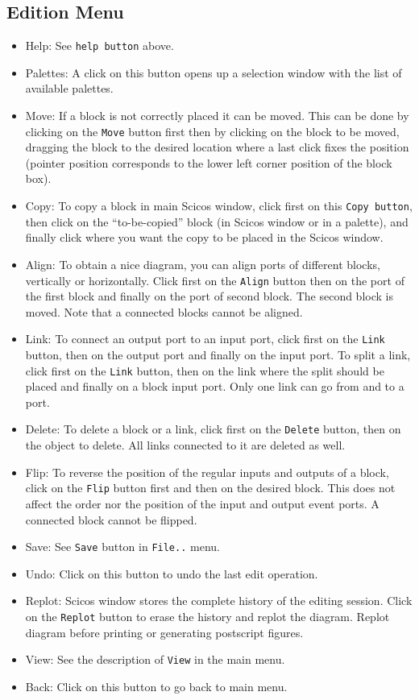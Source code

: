 \subsection{Edition Menu}
\begin{itemize}
\item {Help:} See {\tt help button} above.
\item {Palettes:} A click on this button opens up a selection window
  with the list of available palettes.
\item {Move:} If a block is not correctly placed it can be moved. This can be done
by clicking on the {\tt Move} button first then by clicking on the
block to be moved, dragging the block
to the desired location where a last click fixes the position (pointer
position corresponds to the lower left corner position of the block box).

\item {Copy:}  To copy a block in main Scicos  window, click first on this
  {\tt Copy button}, then click on the ``to-be-copied'' block (in Scicos 
  window or in a palette), and finally click where you want the copy
  to be placed in the Scicos  window.
\item {Align:} To obtain a nice diagram, you can align ports of different
  blocks, vertically or horizontally. Click first on the {\tt Align}
  button then on the port of the first block and finally on the port
  of second block. The second block is moved. Note that a connected
  blocks cannot be aligned.
\item {Link:} To connect an output port to an input port, click first
  on the {\tt Link} button, then on the output port and finally on the
  input port. To split a link, click first on the {\tt Link} button,
  then on the link where the split should be placed and finally on a
  block   input port. Only one link can go from and to a port.
\item {Delete:} To delete a block or a link, click first
  on the {\tt Delete} button, then on the object to delete. All
  links connected to it are deleted as well.
\item {Flip:} To reverse the position of the regular inputs and outputs
  of a block, click on the {\tt Flip} button first and then on the
  desired block. This does not affect the order nor the position of
  the input and output event ports. A connected block cannot be
  flipped.
\item {Save:} See {\tt Save} button in {\tt File..} menu.
\item {Undo:} Click on this button to undo the last edit operation.
\item {Replot:} Scicos  window stores the complete history of the editing
  session. Click on the {\tt Replot} button to erase the history and
  replot the diagram. Replot diagram before printing or generating
postscript figures.
\item {View:} See the description of {\tt View} in the main menu.
\item {Back:} Click on this button to go back to main menu.
\end{itemize}
